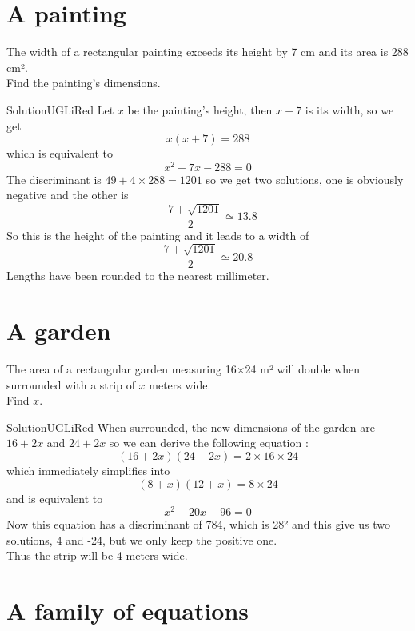 \documentclass[12pt,a4paper,article,english,firamath]{nsi}
\begin{document}
\maketitle


\section*{A painting}
The width of a rectangular painting exceeds its height by 7 cm and its area is 288 cm².\\
Find the painting's dimensions.

\begin{encadrecolore}{Solution}{UGLiRed}
    Let $x$ be the painting's height, then $x+7$ is its width,  so we get $$x(x+7) = 288$$
    which is equivalent to $$x^2+7x-288 = 0$$
    The discriminant is $49+4\times 288= 1201$ so we get two solutions, one is obviously negative and the other is $$\dfrac{-7+\sqrt{1201}}{2}\simeq 13.8$$
    So this is the height of the painting and it leads to a width of
    $$\dfrac{7+\sqrt{1201}}{2}\simeq 20.8$$
    Lengths have been rounded to the nearest millimeter. 

\end{encadrecolore}

\section*{A garden}
The area of a rectangular garden measuring 16$\times$24 m² will double when surrounded with a strip of $x$ meters wide.\\

Find $x$.\\

\begin{encadrecolore}{Solution}{UGLiRed}
    When surrounded, the new dimensions of the garden are $16+2x$ and $24+2x$ so we can derive the following equation :
    $$(16+2x)(24+2x) = 2\times 16 \times 24$$
    which immediately simplifies into
    $$(8+x)(12+x)=8\times24$$
    and is equivalent to $$x^2+ 20x -96=0$$
    Now this equation has a discriminant of 784, which is 28² and this give us two solutions, 4 and -24, but we only keep the positive one.\\
    Thus the strip will be 4 meters wide.

\end{encadrecolore}


\section*{A family of equations}
\end{document}
